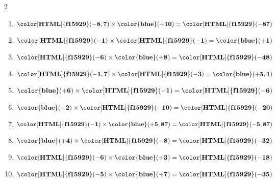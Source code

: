 \begin{corrige}
    \phantom{rrr}    
    \begin{multicols}2
        \begin{enumerate}
            \item $ \mathbf{{\color[HTML]{f15929}(-8,7)}} \times  \mathbf{{\color{blue}(+10)}} = \mathbf{{\color[HTML]{f15929}(-87)}} $
            \item $ \mathbf{{\color[HTML]{f15929}(-1)}} \times  \mathbf{{\color[HTML]{f15929}(-1)}} = \mathbf{{\color{blue}(+1)}} $
            \item $ \mathbf{{\color[HTML]{f15929}(-6)}} \times  \mathbf{{\color{blue}(+8)}} = \mathbf{{\color[HTML]{f15929}(-48)}} $
            \item $ \mathbf{{\color[HTML]{f15929}(-1,7)}} \times  \mathbf{{\color[HTML]{f15929}(-3)}} = \mathbf{{\color{blue}(+5,1)}} $
            \item $ \mathbf{{\color{blue}(+6)}} \times  \mathbf{{\color[HTML]{f15929}(-1)}} = \mathbf{{\color[HTML]{f15929}(-6)}} $
            \item $ \mathbf{{\color{blue}(+2)}} \times  \mathbf{{\color[HTML]{f15929}(-10)}} = \mathbf{{\color[HTML]{f15929}(-20)}} $
            \item $ \mathbf{{\color[HTML]{f15929}(-1)}} \times  \mathbf{{\color{blue}(+5,87)}} = \mathbf{{\color[HTML]{f15929}(-5,87)}} $
            \item $ \mathbf{{\color{blue}(+4)}} \times  \mathbf{{\color[HTML]{f15929}(-8)}} = \mathbf{{\color[HTML]{f15929}(-32)}} $
            \item $ \mathbf{{\color[HTML]{f15929}(-6)}} \times  \mathbf{{\color{blue}(+3)}} = \mathbf{{\color[HTML]{f15929}(-18)}} $
            \item $ \mathbf{{\color[HTML]{f15929}(-5)}} \times  \mathbf{{\color{blue}(+7)}} = \mathbf{{\color[HTML]{f15929}(-35)}} $       
        \end{enumerate}
    \end{multicols}
\end{corrige}